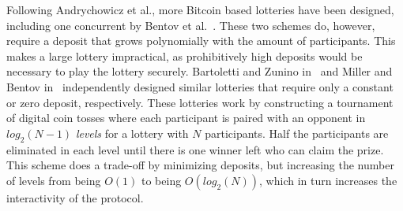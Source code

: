 Following Andrychowicz et al., more Bitcoin based lotteries have been designed, including one concurrent by Bentov et al.~\cite{bentov_how_2014}. These two schemes do, however, require a deposit that grows polynomially with the amount of participants. This makes a large lottery impractical, as prohibitively high deposits would be necessary to play the lottery securely. Bartoletti and Zunino in~\cite{bartoletti_constant-deposit_2017} and Miller and Bentov in~\cite{miller_zero-collateral_2017} independently designed similar lotteries that require only a constant or zero deposit, respectively. These lotteries work by constructing a tournament of digital coin tosses where each participant is paired with an opponent in $log_2(N-1)$ \emph{levels} for a lottery with $N$ participants. Half the participants are eliminated in each level until there is one winner left who can claim the prize. This scheme does a trade-off by minimizing deposits, but increasing the number of levels from being $O(1)$ to being $O(log_2(N))$, which in turn increases the interactivity of the protocol. 
